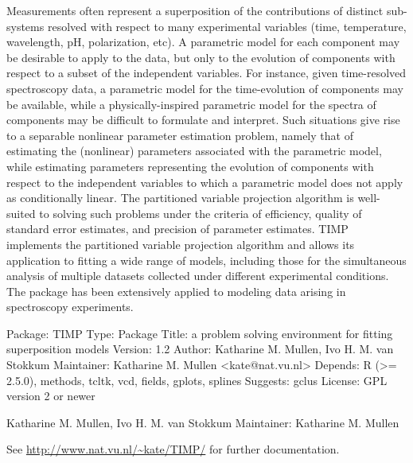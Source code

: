 \documentclass{article}
\begin{document}
\begin{Description}\relax
Measurements often represent a superposition of the contributions of distinct
sub-systems resolved with respect to many experimental variables (time,
temperature, wavelength, pH, polarization, etc).  A parametric model for each
component may be desirable to apply to the data, but only to the evolution of
components with respect to a subset of the independent variables.  For
instance, given time-resolved spectroscopy data, a parametric model for the
time-evolution of components may be available, while a physically-inspired
parametric model for the spectra of components may be difficult to formulate
and interpret.  Such situations give rise to a separable nonlinear parameter
estimation problem, namely that of estimating the (nonlinear) parameters
associated with the parametric model, while estimating parameters representing
the evolution of components with respect to the independent variables to which
a parametric model does not apply as conditionally linear.  The partitioned
variable projection algorithm is well-suited to solving such problems under
the criteria of efficiency, quality of standard error estimates, and precision
of parameter estimates.  TIMP implements the partitioned variable projection
algorithm and allows its application to fitting a wide range of models,
including those for the simultaneous analysis of multiple datasets collected
under different experimental conditions.  The package has been extensively
applied to modeling data arising in spectroscopy experiments.
\end{Description}
\begin{Details}\relax
Package: TIMP
Type: Package
Title: a problem solving environment for fitting superposition models
Version: 1.2
Author: Katharine M. Mullen, Ivo H. M. van Stokkum 
Maintainer: Katharine M. Mullen <kate@nat.vu.nl>
Depends: R (>= 2.5.0), methods, tcltk, vcd, fields, gplots, splines
Suggests: gclus
License: GPL version 2 or newer
\end{Details}
\begin{Author}\relax
Katharine M. Mullen, Ivo H. M. van Stokkum  
Maintainer: Katharine M. Mullen 
\end{Author}
\begin{References}\relax
See \url{http://www.nat.vu.nl/~kate/TIMP/} for further 
documentation.
\end{References}
\end{document}
